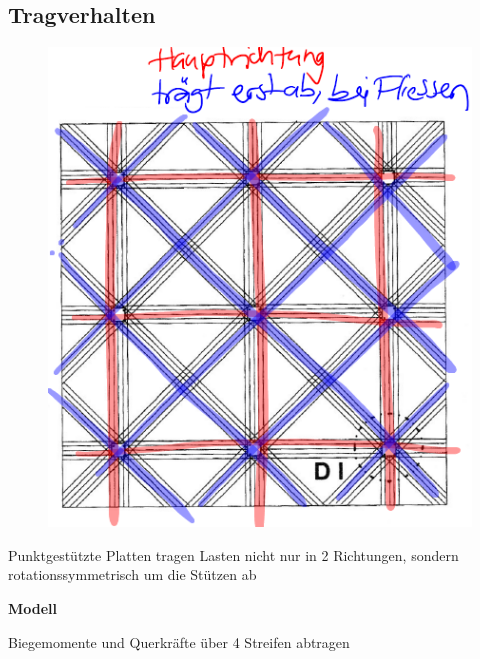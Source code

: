 	\begin{minipage}{0.5\linewidth}
		
		\subsection{Tragverhalten}
		
		\begin{figure}
			\includegraphics[width=\linewidth]{images/PilzFlach1Lastabtrag.PNG}
		\end{figure}
	
		Punktgestützte Platten tragen Lasten nicht nur in 2 Richtungen, sondern rotationssymmetrisch um die Stützen ab
		
		\textbf{Modell}
		
		Biegemomente und Querkräfte über 4 Streifen abtragen \\	
		
		
		

\end{minipage}
